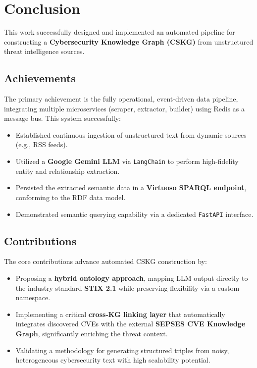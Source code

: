 \section{Conclusion}

This work successfully designed and implemented an automated pipeline for constructing a \textbf{Cybersecurity Knowledge Graph (CSKG)} from unstructured threat intelligence sources.

\subsection{Achievements}
The primary achievement is the fully operational, event-driven data pipeline, integrating multiple microservices (scraper, extractor, builder) using Redis as a message bus. This system successfully:
\begin{itemize}
    \item Established continuous ingestion of unstructured text from dynamic sources (e.g., RSS feeds).
    \item Utilized a \textbf{Google Gemini LLM} via \texttt{LangChain} to perform high-fidelity entity and relationship extraction.
    \item Persisted the extracted semantic data in a \textbf{Virtuoso SPARQL endpoint}, conforming to the RDF data model.
    \item Demonstrated semantic querying capability via a dedicated \texttt{FastAPI} interface.
\end{itemize}

\subsection{Contributions}
The core contributions advance automated CSKG construction by:
\begin{itemize}
    \item Proposing a \textbf{hybrid ontology approach}, mapping LLM output directly to the industry-standard \textbf{STIX 2.1} while preserving flexibility via a custom namespace.
    \item Implementing a critical \textbf{cross-KG linking layer} that automatically integrates discovered CVEs with the external \textbf{SEPSES CVE Knowledge Graph}, significantly enriching the threat context.
    \item Validating a methodology for generating structured triples from noisy, heterogeneous cybersecurity text with high scalability potential.
\end{itemize}

